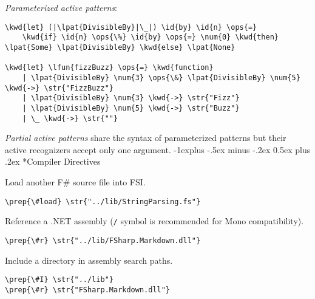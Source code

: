 \documentclass[10pt,landscape]{article}
\makeatletter
\renewcommand{\subsection}{\@startsection{subsection}{2}{0mm}%
                                {-1explus -.5ex minus -.2ex}%
                                {0.5ex plus .2ex}%
                                {\normalfont\normalsize\bfseries}}
\newcommand{\id}[1]{\textcolor[HTML]{000000}{#1}}
\newcommand{\str}[1]{\textcolor[HTML]{A31515}{#1}}
\newcommand{\kwd}[1]{\textcolor[HTML]{0000FF}{#1}}
\newcommand{\ops}[1]{\textcolor[HTML]{000000}{#1}}
\newcommand{\num}[1]{\textcolor[HTML]{000000}{#1}}
\newcommand{\lfun}[1]{\textcolor[HTML]{0000A0}{#1}}
\newcommand{\lpat}[1]{\textcolor[HTML]{800080}{#1}}
\newcommand{\prep}[1]{\textcolor[HTML]{0000FF}{#1}}
\makeatother
\begin{document}
\begin{multicols}{3}
\begin{Verbatim}[commandchars=\\\{\}]
\end{Verbatim}



\emph{Parameterized active patterns}:
\begin{Verbatim}[commandchars=\\\{\}]
\kwd{let} (|\lpat{DivisibleBy}|\_|) \id{by} \id{n} \ops{=} 
    \kwd{if} \id{n} \ops{\%} \id{by} \ops{=} \num{0} \kwd{then} \lpat{Some} \lpat{DivisibleBy} \kwd{else} \lpat{None}

\kwd{let} \lfun{fizzBuzz} \ops{=} \kwd{function} 
    | \lpat{DivisibleBy} \num{3} \ops{\&} \lpat{DivisibleBy} \num{5} \kwd{->} \str{"FizzBuzz"} 
    | \lpat{DivisibleBy} \num{3} \kwd{->} \str{"Fizz"} 
    | \lpat{DivisibleBy} \num{5} \kwd{->} \str{"Buzz"} 
    | \_ \kwd{->} \str{""} 

\end{Verbatim}



\emph{Partial active patterns} share the syntax of parameterized patterns but their active recognizers accept only one argument.
\subsection*{Compiler Directives}



Load another F\# source file into FSI.
\begin{Verbatim}[commandchars=\\\{\}]
\prep{\#load} \str{"../lib/StringParsing.fs"}

\end{Verbatim}



Reference a .NET assembly (\texttt{/} symbol is recommended for Mono compatibility).
\begin{Verbatim}[commandchars=\\\{\}]
\prep{\#r} \str{"../lib/FSharp.Markdown.dll"}

\end{Verbatim}



Include a directory in assembly search paths.
\begin{Verbatim}[commandchars=\\\{\}]
\prep{\#I} \str{"../lib"}
\prep{\#r} \str{"FSharp.Markdown.dll"}

\end{Verbatim}




\end{multicols}
\end{document}
